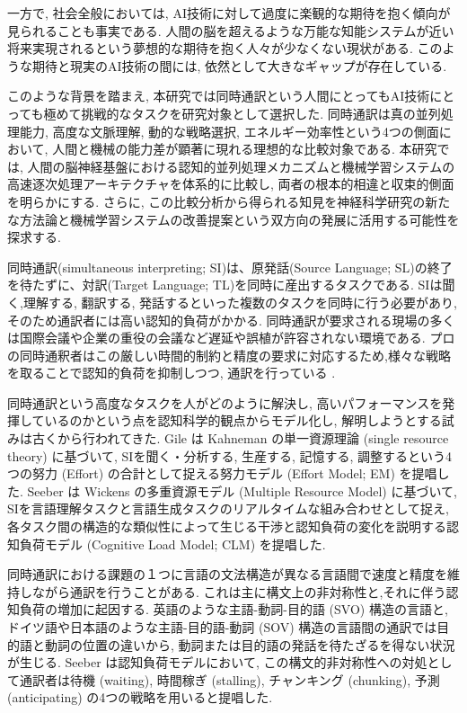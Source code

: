 一方で, 社会全般においては, AI技術に対して過度に楽観的な期待を抱く傾向が見られることも事実である.
人間の脳を超えるような万能な知能システムが近い将来実現されるという夢想的な期待を抱く人々が少なくない現状がある.
このような期待と現実のAI技術の間には, 依然として大きなギャップが存在している.

このような背景を踏まえ, 本研究では同時通訳という人間にとってもAI技術にとっても極めて挑戦的なタスクを研究対象として選択した.
同時通訳は真の並列処理能力, 高度な文脈理解, 動的な戦略選択, エネルギー効率性という4つの側面において, 人間と機械の能力差が顕著に現れる理想的な比較対象である.
本研究では, 人間の脳神経基盤における認知的並列処理メカニズムと機械学習システムの高速逐次処理アーキテクチャを体系的に比較し, 両者の根本的相違と収束的側面を明らかにする.
さらに, この比較分析から得られる知見を神経科学研究の新たな方法論と機械学習システムの改善提案という双方向の発展に活用する可能性を探求する.

同時通訳(simultaneous interpreting; SI)は、原発話(Source Language; SL)の終了を待たずに、対訳(Target Language; TL)を同時に産出するタスクである.
SIは聞く,理解する, 翻訳する, 発話するといった複数のタスクを同時に行う必要があり, そのため通訳者には高い認知的負荷がかかる. 
同時通訳が要求される現場の多くは国際会議や企業の重役の会議など遅延や誤植が許容されない環境である.
プロの同時通釈者はこの厳しい時間的制約と精度の要求に対応するため,様々な戦略を取ることで認知的負荷を抑制しつつ, 通訳を行っている \cite{seeber2011cognitive} .

同時通訳という高度なタスクを人がどのように解決し, 高いパフォーマンスを発揮しているのかという点を認知科学的観点からモデル化し, 解明しようとする試みは古くから行われてきた.
Gile \cite{gile1995regards, gile1997conference} は Kahneman \cite{kahneman1973attention} の単一資源理論 (single resource theory) に基づいて, SIを聞く・分析する, 生産する, 記憶する, 調整するという4つの努力 (Effort) の合計として捉える努力モデル (Effort Model; EM) を提唱した.
Seeber \cite{seeber2011cognitive} は Wickens \cite{wickens1984processing, wickens2002multiple} の多重資源モデル (Multiple Resource Model) に基づいて, SIを言語理解タスクと言語生成タスクのリアルタイムな組み合わせとして捉え, 各タスク間の構造的な類似性によって生じる干渉と認知負荷の変化を説明する認知負荷モデル (Cognitive Load Model; CLM) を提唱した.

同時通訳における課題の１つに言語の文法構造が異なる言語間で速度と精度を維持しながら通訳を行うことがある.
これは主に構文上の非対称性と,それに伴う認知負荷の増加に起因する.
英語のような主語-動詞-目的語 (SVO) 構造の言語と, ドイツ語や日本語のような主語-目的語-動詞 (SOV) 構造の言語間の通訳では目的語と動詞の位置の違いから, 動詞または目的語の発話を待たざるを得ない状況が生じる.
Seeber \cite{seeber2011cognitive} は認知負荷モデルにおいて, この構文的非対称性への対処として通訳者は待機 (waiting), 時間稼ぎ (stalling), チャンキング (chunking), 予測 (anticipating) の4つの戦略を用いると提唱した.

